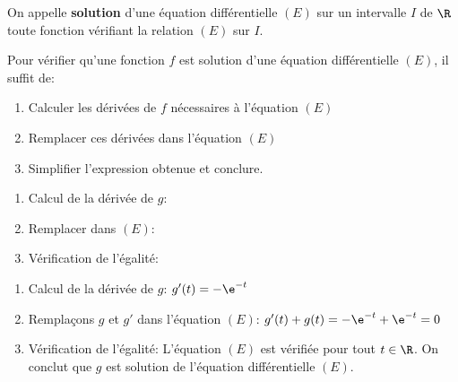 \medskip

\begin{definition}{}
On appelle \textbf{solution} d'une équation différentielle $(E)$ sur un intervalle $I$ de $\R$ toute fonction vérifiant la relation $(E)$ sur $I$.

\end{definition}

\medskip

\begin{methode}{}
Pour vérifier qu'une fonction $f$ est solution d'une équation différentielle $(E)$, il suffit de:
\begin{enumerate}
	\item Calculer les dérivées de $f$ nécessaires à l'équation $(E)$
	\medskip
	\item Remplacer ces dérivées dans l'équation $(E)$
	\medskip
	\item Simplifier l'expression obtenue et conclure.
\end{enumerate}
\end{methode}

\begin{exemple}[Vérifiez que $g(t)=\e^{-t}$ est solution de $(E):\: y'+y=0$]{}


\begin{blocvisiblex}[height=3.5]
    {\begin{enumerate}
		\item Calcul de la dérivée de $g$: \dotfill{}
		\item Remplacer dans $(E)$: \dotfill{}
		\item Vérification de l'égalité: \dotfill{}
	\end{enumerate}


	}
\begin{enumerate}
	\item Calcul de la dérivée de $g$: $g'(t)=-\e^{-t}$

	\item Remplaçons $g$ et $g'$ dans l'équation $(E)$: $g'(t)+g(t)=-\e^{-t}+\e^{-t}=0$

	\item Vérification de l'égalité:
	L'équation $(E)$ est vérifiée pour tout $t \in \R$. On conclut que $g$ est solution de l'équation différentielle $(E)$.
	
\end{enumerate}

\end{blocvisiblex}


\end{exemple}

